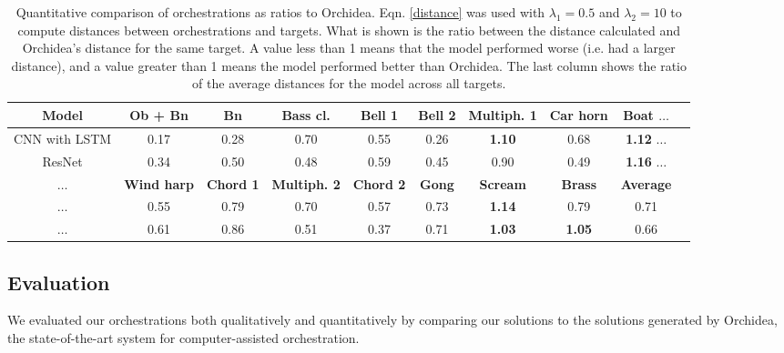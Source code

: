 \documentclass{article}
\begin{document}
\begin{table}
  \begin{center}
    \label{orch_eval}
    \begin{tabular}{|c|c|c|c|c|c|c|c|c|c}
     \hline
      \textbf{Model} & \textbf{Ob + Bn} & \textbf{Bn} & \textbf{Bass cl.} & \textbf{Bell 1} & \textbf{Bell 2} & \textbf{Multiph. 1} & \textbf{Car horn} & \textbf{Boat} $\ldots$ \\
      \hline
      CNN with LSTM & 0.17 & 0.28 & 0.70 & 0.55 & 0.26 & \textbf{1.10} & 0.68 & \textbf{1.12} $\ldots$  \\
      \hline
      ResNet & 0.34 & 0.50 & 0.48 & 0.59 & 0.45 & 0.90 & 0.49 & \textbf{1.16} $\ldots$ \\
      \hline
      \hline
      \textbf{$\ldots$} & \textbf{Wind harp} & \textbf{Chord 1} & \textbf{Multiph. 2} & \textbf{Chord 2} & \textbf{Gong} & \textbf{Scream} & \textbf{Brass} & \textbf{Average}  \\
      \hline
      $\ldots$ & 0.55 & 0.79 & 0.70 & 0.57 & 0.73 & \textbf{1.14} & 0.79 & 0.71\\
      \hline
      $\ldots$  & 0.61 & 0.86 & 0.51 & 0.37 & 0.71 & \textbf{1.03} & \textbf{1.05} & 0.66 \\
      \hline
    \end{tabular}
  \end{center}
  \caption{Quantitative comparison of orchestrations as ratios to Orchidea. Eqn. \eqref{distance} was used with $\lambda_1 = 0.5$ and $\lambda_2 = 10$ to compute distances between orchestrations and targets. What is shown is the ratio between the distance calculated and Orchidea's distance for the same target. A value less than 1 means that the model performed worse (i.e. had a larger distance), and a value greater than 1 means the model performed better than Orchidea. The last column shows the ratio of the average distances for the model across all targets.}
\end{table}

\subsection{Evaluation}

We evaluated our orchestrations both qualitatively and quantitatively by comparing our solutions to the solutions generated by Orchidea, the state-of-the-art system for computer-assisted orchestration. 
\end{document}
